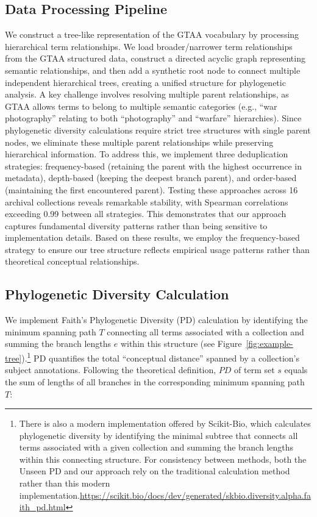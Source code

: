 \documentclass[final]{anthology-ch}
\begin{document}
\subsection{Data Processing Pipeline}
We construct a tree-like representation of the GTAA vocabulary by processing hierarchical term relationships. We load broader/narrower term relationships from the GTAA structured data, construct a directed acyclic graph representing semantic relationships, and then add a synthetic root node to connect multiple independent hierarchical trees, creating a unified structure for phylogenetic analysis. 
%
A key challenge involves resolving multiple parent relationships, as GTAA allows terms to belong to multiple semantic categories (e.g., ``war photography'' relating to both ``photography'' and ``warfare'' hierarchies). Since phylogenetic diversity calculations require strict tree structures with single parent nodes, we eliminate these multiple parent relationships while preserving hierarchical information. 
To address this, we implement three deduplication strategies: frequency-based (retaining the parent with the highest occurrence in metadata), depth-based (keeping the deepest branch parent), and order-based (maintaining the first encountered parent). Testing these approaches across 16 archival collections reveals remarkable stability, with Spearman correlations exceeding 0.99 between all strategies. This demonstrates that our approach captures fundamental diversity patterns rather than being sensitive to implementation details. Based on these results, we employ the frequency-based strategy to ensure our tree structure reflects empirical usage patterns rather than theoretical conceptual relationships.

\subsection{Phylogenetic Diversity Calculation}

We implement Faith's Phylogenetic Diversity (\textrm{PD}) calculation by identifying the minimum spanning path $T$ connecting all terms associated with a collection and summing the branch lengths $e$ within this structure (see Figure~\ref{fig:example-tree}).\footnote{There is also a modern implementation offered by Scikit-Bio, which calculates phylogenetic diversity by identifying the minimal subtree that connects all terms associated with a given collection and summing the branch lengths within this connecting structure. For consistency between methods, both the Unseen PD and our approach rely on the traditional calculation method rather than this modern implementation.\url{https://scikit.bio/docs/dev/generated/skbio.diversity.alpha.faith_pd.html}} PD quantifies the total ``conceptual distance'' spanned by a collection's subject annotations.
%
Following the theoretical definition, $PD$ of term set $s$ equals the sum of lengths of all branches in the corresponding minimum spanning path $T$:
\end{document}
